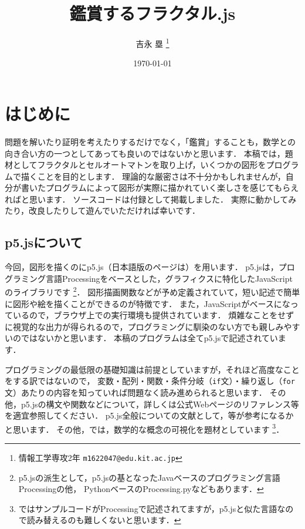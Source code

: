 \documentclass[dvipdfmx]{jsarticle}
\title{鑑賞するフラクタル.js}
\author{吉永 塁 \thanks{情報工学専攻2年 \texttt{m1622047@edu.kit.ac.jp}}}
\date{\today}
\theoremstyle{definition}
\begin{document}
\maketitle


\section{はじめに}  \label{sec_introduction}
問題を解いたり証明を考えたりするだけでなく，「鑑賞」することも，数学との向き合い方の一つとしてあっても良いのではないかと思います．
本稿では，題材としてフラクタルとセルオートマトンを取り上げ，いくつかの図形をプログラムで描くことを目的とします．
理論的な厳密さは不十分かもしれませんが，自分が書いたプログラムによって図形が実際に描かれていく楽しさを感じてもらえればと思います．
ソースコードは付録として掲載しました．
実際に動かしてみたり，改良したりして遊んでいただければ幸いです．

\subsection{p5.jsについて}  \label{subsec_processing}
今回，図形を描くのにp5.js\cite{p5js}（日本語版のページは\cite{p5jsjp}）を用います．
p5.jsは，プログラミング言語Processing\cite{pcweb}をベースとした，グラフィクスに特化したJavaScriptのライブラリです
\footnote{
    p5.jsの派生として，p5.jsの基となったJavaベースのプログラミング言語Processing\cite{pcweb}の他，
    PythonベースのProcessing.py\cite{pcpy}などもあります．
}．
図形描画関数などが予め定義されていて，短い記述で簡単に図形や絵を描くことができるのが特徴です．
また，JavaScriptがベースになっているので，ブラウザ上での実行環境\cite{p5jseditor}も提供されています．
煩雑なことをせずに視覚的な出力が得られるので，プログラミングに馴染のない方でも親しみやすいのではないかと思います．
本稿のプログラムは全てp5.jsで記述されています．

プログラミングの最低限の基礎知識は前提としていますが，それほど高度なことをする訳ではないので，
変数・配列・関数・条件分岐（\texttt{if}文）・繰り返し（\texttt{for}文）あたりの内容を知っていれば問題なく読み進められると思います．
その他，p5.jsの構文や関数などについて，詳しくは公式Webページのリファレンス等を適宜参照してください．
p5.js全般についての文献として，\cite{gendeswp5js,cgmediaart}等が参考になるかと思います．
その他，\cite{mathgen}では，数学的な概念の可視化を題材としています
\footnote{
    \cite{mathgen}ではサンプルコードがProcessingで記述されてますが，p5.jsと似た言語なので読み替えるのも難しくないと思います．
}．
\end{document}
